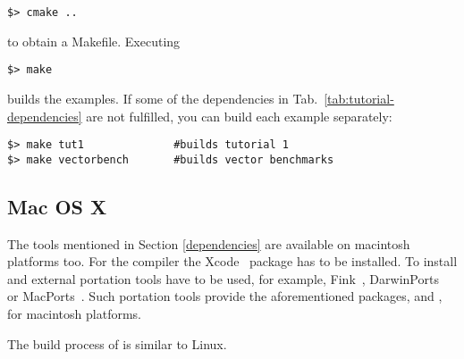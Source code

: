 \begin{exaipd}
\begin{Verbatim}
$> cmake ..
\end{Verbatim}
\end{exaipd}

to obtain a Makefile.
Executing

\begin{exaipd}
\begin{Verbatim}
$> make 
\end{Verbatim}
\end{exaipd}

builds the examples. If some of the dependencies in
Tab.~\ref{tab:tutorial-dependencies} are not fulfilled, you can build each
example separately:
\begin{exaipd}
\begin{Verbatim}
$> make tut1              #builds tutorial 1
$> make vectorbench       #builds vector benchmarks
\end{Verbatim}
\end{exaipd}



\subsection{Mac OS X}
\label{apple}
The tools mentioned in Section \ref{dependencies} are available on 
macintosh platforms too. 
For the {\GCC} compiler the Xcode~\cite{xcode} package has to be installed.
To install {\CMake} and {\Boost} external portation tools have to be used, 
for example, Fink~\cite{fink}, DarwinPorts~\cite{darwinports} 
or MacPorts~\cite{macports}. Such portation tools provide the 
aforementioned packages, {\CMake} and {\Boost}, for macintosh platforms. 


The build process of {\ViennaData} is similar to Linux.


